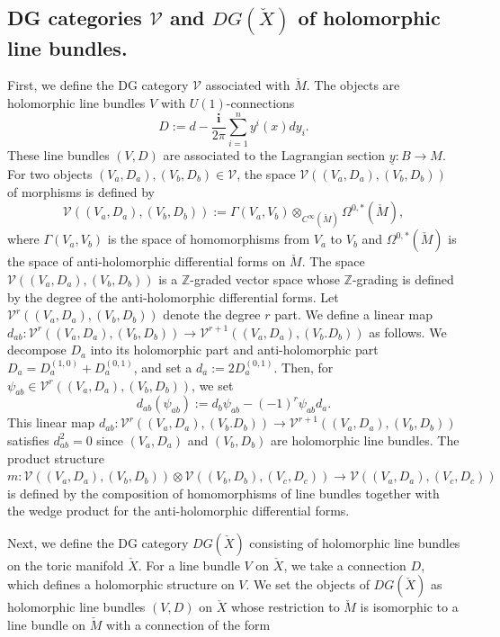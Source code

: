\documentclass[12pt,reqno]{amsart}
\newcommand{\Z}{{\mathbb{Z}}}
\newcommand{\ii}{{\mathbf{i}}}
\newcommand{\cV}{{\mathcal{V}}}
\theoremstyle{definition}
\begin{document}
\subsection{DG categories $\cV$ and $DG(\check{X})$ of holomorphic line bundles.}\label{lineDG}
First, we define the DG category $\cV$ associated with $\check{M}$. The objects are holomorphic line bundles $V$ with $U(1)$-connections
\begin{equation}\label{connection}
D := d - \frac{\ii}{2\pi}\sum_{i=1}^ny^i(x)dy_i.
\end{equation}
These line bundles $(V,D)$ are associated to the Lagrangian section $\underline{y}:B\to M$. For two objects $(V_a,D_a),(V_b,D_b)\in\cV$, the space $\cV((V_a,D_a),(V_b,D_b))$ of morphisms is defined by
\begin{equation*}
\cV((V_a,D_a),(V_b,D_b)) := \Gamma(V_a,V_b)\otimes_{C^\infty(\check{M})}\Omega^{0,*}(\check{M}),
\end{equation*}
where $\Gamma(V_a,V_b)$ is the space of homomorphisms from $V_a$ to $V_b$ and $\Omega^{0,*}(\check{M})$ is the space of anti-holomorphic differential forms on $\check{M}$. The space $\cV((V_a,D_a),(V_b,D_b))$ is a $\Z$-graded vector space whose $\Z$-grading is defined by the degree of the anti-holomorphic differential forms. Let  $\cV^r((V_a,D_a),(V_b,D_b))$ denote the degree $r$ part. We define a linear map $d_{ab}:\cV^r((V_a,D_a),(V_b,D_b))\to\cV^{r+1}((V_a,D_a),(V_b.D_b))$ as follows. We decompose $D_a$ into its holomorphic part and anti-holomorphic part $D_a= D_a^{(1,0)} + D_a^{(0,1)}$, and set a $d_a:=2D_a^{(0,1)}$. Then, for $\psi_{ab}\in\cV^r((V_a,D_a),(V_b,D_b))$, we set
\begin{equation*}
d_{ab}(\psi_{ab}) := d_b\psi_{ab} -(-1)^r\psi_{ab}d_a.
\end{equation*}
This linear map $d_{ab}:\cV^r((V_a,D_a),(V_b.D_b))\to\cV^{r+1}((V_a,D_a),(V_b,D_b))$ satisfies $d_{ab}^2=0$ since $(V_a,D_a)$ and $(V_b,D_b)$ are holomorphic line bundles. The product structure $m:\cV((V_a,D_a),(V_b,D_b))\otimes\cV((V_b,D_b),(V_c,D_c))\to\cV((V_a,D_a),(V_{c},D_{c}))$ is defined by the composition of homomorphisms of line bundles together with the wedge product for the anti-holomorphic differential forms.\par
Next, we define the DG category $DG(\check{X})$ consisting of holomorphic line bundles on the toric manifold $\check{X}$. For a line bundle $V$ on $\check{X}$, we take a connection $D$, which defines a holomorphic structure on $V$. We set the objects of $DG(\check{X})$ as holomorphic line bundles $(V,D)$ on $\check{X}$ whose restriction to $\check{M}$ is isomorphic to a line bundle on $\check{M}$ with a connection of the form
\end{document}
